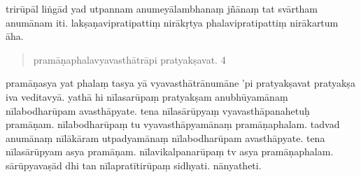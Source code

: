 \documentclass{article}
\begin{document}
\pstart
trirūpāl liṅgād yad utpannam anumeyālambhanaṃ jñānaṃ tat svārtham anumānam iti.
\pend
\pstart
 lakṣaṇavipratipattiṃ nirākṛtya phalavipratipattiṃ nirākartum āha. 
\pend
\pstart
\begin{quote}
pramāṇaphalavyavasthātrāpi pratyakṣavat. 4
\end{quote} 
\pend
\pstart
pramāṇasya yat phalaṃ tasya yā vyavasthātrānumāne 'pi pratyakṣavat pratyakṣa iva veditavyā. 
 \pend
 \pstart
{}yathā hi nīlasarūpaṃ pratyakṣam anubhūyamānaṃ nīlabodharūpam avasthāpyate. tena nīlasārūpyaṃ vyavasthāpanahetuḥ pramāṇam. nīlabodharūpaṃ tu vyavasthāpyamānaṃ pramāṇaphalam. tadvad anumānaṃ nīlākāram utpadyamānaṃ nīlabodharūpam avasthāpyate. tena nīlasārūpyam asya pramāṇam. nīlavikalpanarūpaṃ tv asya pramāṇaphalam. sārūpyavaṣād dhi tan nīlapratītirūpaṃ sidhyati. nānyatheti.
\pend
{}\baselineskip
\end{document}
